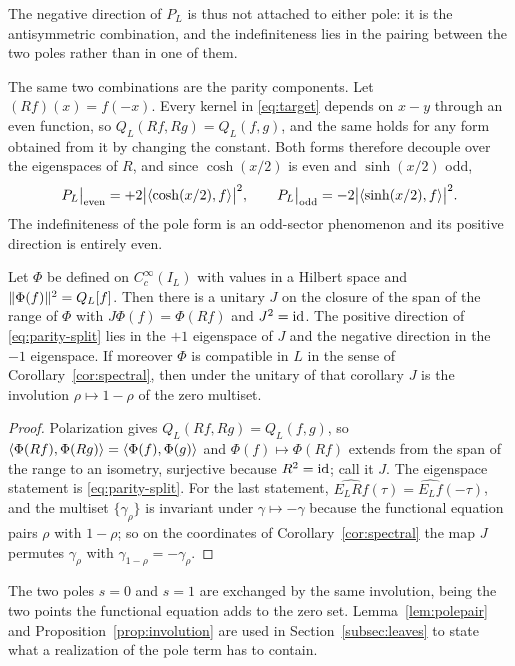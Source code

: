 The negative direction of $P_L$ is thus not attached to either pole: it is the
antisymmetric combination, and the indefiniteness lies in the pairing between
the two poles rather than in one of them.

The same two combinations are the parity components. Let $(Rf)(x)=f(-x)$.
Every kernel in \eqref{eq:target} depends on $x-y$ through an even function,
so $Q_L(Rf,Rg)=Q_L(f,g)$, and the same holds for any form obtained from it by changing the
constant.
Both forms therefore decouple over the eigenspaces of $R$, and since
$\cosh(x/2)$ is even and $\sinh(x/2)$ odd,
\begin{equation}\label{eq:parity-split}
 P_L\big|_{\text{even}}=+2\big|\langle \cosh(x/2),f\rangle\big|^2,
 \qquad
 P_L\big|_{\text{odd}}=-2\big|\langle \sinh(x/2),f\rangle\big|^2 .
\end{equation}
The indefiniteness of the pole form is an odd-sector phenomenon and its
positive direction is entirely even.

\begin{proposition}\label{prop:involution}
Let $\Phi$ be defined on $C_c^\infty(I_L)$ with values in a Hilbert space and
$\lVert \Phi(f)\rVert^2=Q_L[f]$. Then there is a unitary $J$ on the closure of the
span of the range of $\Phi$ with $J\Phi(f)=\Phi(Rf)$ and $J^2=\mathrm{id}$. The
positive direction of \eqref{eq:parity-split} lies in the $+1$ eigenspace of
$J$ and the negative direction in the $-1$ eigenspace. If moreover $\Phi$ is
compatible in $L$ in the sense of Corollary~\ref{cor:spectral}, then under the
unitary of that corollary $J$ is the involution $\rho\mapsto1-\rho$ of the
zero multiset.
\end{proposition}
\begin{proof}
Polarization gives $Q_L(Rf,Rg)=Q_L(f,g)$, so
$\langle \Phi(Rf),\Phi(Rg)\rangle=\langle \Phi(f),\Phi(g)\rangle$ and $\Phi(f)\mapsto\Phi(Rf)$
extends from the span of the range to an isometry, surjective because
$R^2=\mathrm{id}$; call it $J$. The eigenspace statement is \eqref{eq:parity-split}.
For the last statement, $\widehat{E_LRf}(\tau)=\widehat{E_Lf}(-\tau)$, and the
multiset $\{\gamma_\rho\}$ is invariant under $\gamma\mapsto-\gamma$ because
the functional equation pairs $\rho$ with $1-\rho$; so on the coordinates of
Corollary~\ref{cor:spectral} the map $J$ permutes $\gamma_\rho$ with
$\gamma_{1-\rho}=-\gamma_\rho$.
\end{proof}

The two poles $s=0$ and $s=1$ are exchanged by the same involution, being the
two points the functional equation adds to the zero set. Lemma~\ref{lem:polepair}
and Proposition~\ref{prop:involution} are used in
Section~\ref{subsec:leaves} to state what a realization of the pole term has
to contain.
